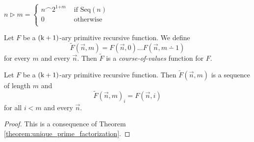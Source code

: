 \documentclass[10pt]{amsart}
\newcommand{\mle}{\boldsymbol{<}}
\newcommand{\meq}{\boldsymbol{=}}
\newcommand{\mplus}{\boldsymbol{+}}
\begin{document}
\begin{definition}
	$n \triangleright m \meq \begin{cases}
			n \frown 2^{1 \mplus m} & \mbox{ if }\mathrm{Seq}(n) \\
			0                       & \mbox{ otherwise }         \\
		\end{cases}$
\end{definition}

\begin{definition}
	Let $F$ be a $\rm{(k + 1)}$-ary primitive recursive function. We define
	$$\tilde{F}(\vec{n},m) \meq F(\vec{n},0)...F(\vec{n},m \dotminus 1)$$
	for every $m$ and every $\vec{n}$. Then $\tilde{F}$ is a \textit{course-of-values} function for $F$.
\end{definition}

\begin{fact}\label{fact:course_of_values_function}
	Let $F$ be a $\rm{(k + 1)}$-ary primitive recursive function. Then $\tilde{F}(\vec{n},m)$ is a sequence of length $m$ and
	$$\tilde{F}(\vec{n},m)_i \meq F(\vec{n},i)$$
	for all $i \mle m$ and every $\vec{n}$.
\end{fact}
\begin{proof}
	This is a consequence of Theorem \ref{theorem:unique_prime_factorization}.
\end{proof}
\end{document}
